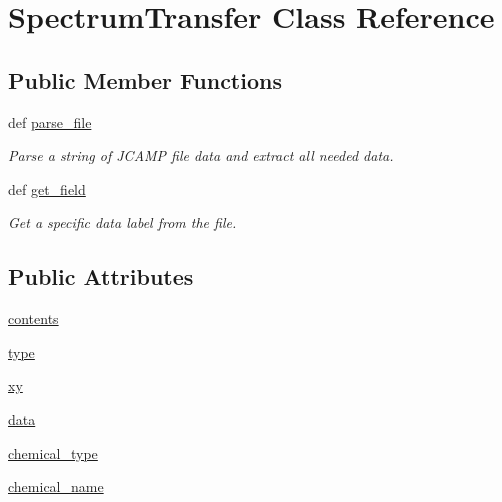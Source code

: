 \hypertarget{classuploader_1_1_spectrum_transfer}{
\section{SpectrumTransfer Class Reference}
\label{classuploader_1_1_spectrum_transfer}
}
\subsection*{Public Member Functions}
\begin{DoxyCompactItemize}
\item 
def \hyperlink{classuploader_1_1_spectrum_transfer_a14401ccceaf67f005506de0a8320b089}{parse\_\-file}
\begin{DoxyCompactList}\small\item\em Parse a string of JCAMP file data and extract all needed data. \item\end{DoxyCompactList}\item 
def \hyperlink{classuploader_1_1_spectrum_transfer_af50426ecd14fc9667344dbf5407fb487}{get\_\-field}
\begin{DoxyCompactList}\small\item\em Get a specific data label from the file. \item\end{DoxyCompactList}\end{DoxyCompactItemize}
\subsection*{Public Attributes}
\begin{DoxyCompactItemize}
\item 
\hyperlink{classuploader_1_1_spectrum_transfer_aa6082c83a20a90e5a2ab9f216961972f}{contents}
\item 
\hyperlink{classuploader_1_1_spectrum_transfer_a7aead736a07eaf25623ad7bfa1f0ee2d}{type}
\item 
\hyperlink{classuploader_1_1_spectrum_transfer_a3f6f55ba521257932bb08684e0181fa1}{xy}
\item 
\hyperlink{classuploader_1_1_spectrum_transfer_a511ae0b1c13f95e5f08f1a0dd3da3d93}{data}
\item 
\hyperlink{classuploader_1_1_spectrum_transfer_ab23a1bfe0956557e254961031d578c23}{chemical\_\-type}
\item 
\hyperlink{classuploader_1_1_spectrum_transfer_a77c112c599aae1eeb8d54936bb435177}{chemical\_\-name}
\end{DoxyCompactItemize}
